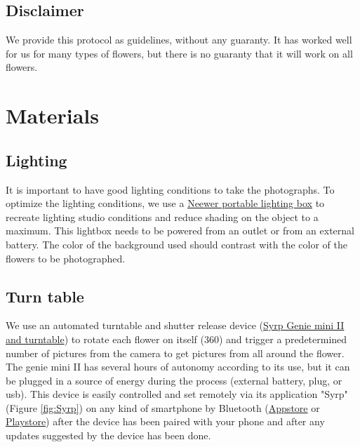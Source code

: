 \documentclass[
]{book}
\begin{document}
\hypertarget{disclaimer}{%
\section{Disclaimer}\label{disclaimer}}

We provide this protocol as guidelines, without any guaranty. It has worked well for us for many types of flowers, but there is no guaranty that it will work on all flowers.

\hypertarget{materials}{%
\chapter{Materials}\label{materials}}

\hypertarget{lighting}{%
\section{Lighting}\label{lighting}}

It is important to have good lighting conditions to take the
photographs. To optimize the lighting conditions, we use a \href{https://neewer.com/collections/shooting-tent}{Neewer
portable lighting box} to
recreate lighting studio conditions and reduce shading on the object to
a maximum. This lightbox needs to be powered from an outlet or from an
external battery. The color of the background used should contrast with
the color of the flowers to be photographed.

\hypertarget{turn-table}{%
\section{Turn table}\label{turn-table}}

We use an automated turntable and shutter release device (\href{https://www.bhphotovideo.com/c/product/1486043-REG/syrp_sykit_0043_genie_mini_ii_turntable.html/quick-compare}{Syrp Genie
mini II and turntable}) to rotate each flower on itself (360) and trigger a predetermined number of pictures from the camera to get pictures from all around the flower. The genie mini II has several hours of autonomy according to its use, but it can be plugged in a source of energy during the process (external battery, plug, or usb). This device is easily controlled and set remotely via its application "Syrp" (Figure \ref{fig:Syrp}) on any kind of smartphone by Bluetooth (\href{https://apps.apple.com/us/app/syrp/id1387335063}{Appstore} or \href{https://play.google.com/store/apps/details?id=nz.co.syrp.genie2\&hl=fr_CA\&gl=US}{Playstore}) after the device has been paired with your phone and after any updates suggested by the device has been done.
\end{document}

